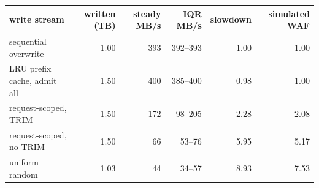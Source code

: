 \begin{tabular}{lrrrrr}
\toprule
write stream & written (TB) & steady MB/s & IQR MB/s & slowdown & simulated WAF \\
\midrule
sequential overwrite & 1.00 & 393 & 392--393 & 1.00 & 1.00 \\
LRU prefix cache, admit all & 1.50 & 400 & 385--400 & 0.98 & 1.00 \\
request-scoped, TRIM & 1.50 & 172 & 98--205 & 2.28 & 2.08 \\
request-scoped, no TRIM & 1.50 & 66 & 53--76 & 5.95 & 5.17 \\
uniform random & 1.03 & 44 & 34--57 & 8.93 & 7.53 \\
\bottomrule
\end{tabular}
